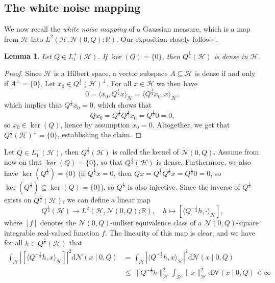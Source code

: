 \documentclass[letterpaper]{article} %
\newcommand{\R}{\mathbb{R}}
\newcommand{\hs}[1]{\mathcal{#1}} %
\newcommand{\Normal}{\mathcal{N}}
\newtheorem{lemma}[theorem]{Lemma}
\begin{document}
\subsection{The white noise mapping}
We now recall the \emph{white noise mapping} of a Gaussian measure, which is a map from $\hs{H}$ into $L^2(\hs{H},\Normal(0,Q);\R)$.
Our exposition closely follows \cite[Section~1.2.4]{daprato2002second}.
\begin{lemma} \label{lemma:kernelDense}
Let $Q\in L_1^+(\hs{H})$. If $\ker(Q)=\{0\}$, then $Q^\frac12(\hs{H})$ is dense in $\hs{H}$.
\end{lemma}
\begin{proof}
Since $\hs{H}$ is a Hilbert space, a vector subspace $A\subseteq\hs{H}$ is dense if and only if $A^\perp=\{0\}$.
Let $x_0 \in Q^\frac12(\hs{H})^\perp$. For all $x\in \hs{H}$ we then have
\begin{equation*}
    0 = \langle x_0, Q^\frac12 x\rangle_\hs{H} = \langle Q^\frac12 x_0, x\rangle_\hs{H},
\end{equation*}
which implies that $Q^\frac12 x_0 = 0$, which shows that
\begin{equation*}
    Qx_0 = Q^\frac12 Q^\frac12x_0 = Q^\frac12 0 = 0,
\end{equation*}
so $x_0\in\ker(Q)$, hence by assumption $x_0=0$. 
Altogether, we get that $Q^\frac12(\hs{H})^\perp=\{0\}$, establishing the claim.
\end{proof}
Let $Q\in L_1^+(\hs{H})$, then $Q^\frac12(\hs{H})$ is called the kernel of $\Normal(0,Q)$. 
Assume from now on that $\ker(Q)=\{0\}$, so that $Q^\frac12(\hs{H})$ is dense.
Furthermore, we also have $\ker(Q^\frac12)=\{0\}$ (if $Q^\frac12 x = 0$, then $Qx=Q^\frac12 Q^\frac12x=Q^\frac12 0=0$, so $\ker(Q^\frac12)\subseteq \ker(Q)=\{0\}$),
so $Q^\frac12$ is also injective.
Since the inverse of $Q^\frac12$ exists on $Q^\frac12(\hs{H})$, we can define a linear map
\begin{equation}
    Q^\frac12(\hs{H}) \rightarrow L^2(\hs{H},\Normal(0,Q);\R),
    \quad 
    h \mapsto [\langle Q^{-\frac12}h,\cdot\rangle_{\hs{H}}],
\end{equation}
where $[f]$ denotes the $\Normal(0,Q)$-nullset equivalence class of a $\Normal(0,Q)$-square integrable real-valued function $f$.
The linearity of this map is clear, and we have for all $h\in Q^{\frac12}(\hs{H})$ that
\begin{align*}
    \int_\hs{H} |[\langle Q^{-\frac12}h,x\rangle_{\hs{H}}]|^2\mathrm{d}\Normal(x\mid 0,Q)
    & = \int_\hs{H} |\langle Q^{-\frac12}h,x\rangle_{\hs{H}}|^2\mathrm{d}\Normal(x\mid 0,Q) \\
    & \leq \| Q^{-\frac12}h\|_\hs{H}^2 \int_\hs{H}\|x\|_{\hs{H}}^2\mathrm{d}\Normal(x\mid 0,Q) <\infty
\end{align*}
\end{document}
